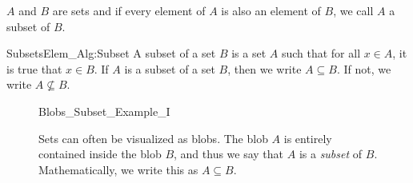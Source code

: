 \documentclass[crop=false,class=book,oneside]{standalone}                      %
\begin{document}
            $A$ and $B$ are sets and if every
            element of $A$ is also an element of $B$,
            we call $A$ a subset of $B$.
            \begin{fdefinition}{Subsets}{Elem_Alg:Subset}
                A subset of a set $B$ is a set $A$
                such that for all $x\in{A}$,
                it is true that $x\in{B}$. If $A$ is a
                subset of a set $B$, then we write
                $A\subseteq{B}$. If not, we write
                $A\not\subseteq{B}$.
            \end{fdefinition}
            \begin{figure}[H]
                \centering
                \captionsetup{type=figure}
                {Blobs_Subset_Example_I}
                \caption[Visual for Subsets]
                        {Sets can often be visualized as blobs.
                         The blob $A$ is entirely contained
                         inside the blob $B$, and thus we say
                         that $A$ is a
                         \textit{subset} of $B$. Mathematically,
                         we write this
                         as $A\subseteq{B}$.}
                \label{fig:Elem_Alg_Subsets_Example}
            \end{figure}
\end{document}
